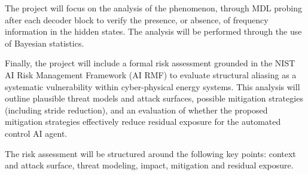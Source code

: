 The project will focus on the analysis of the phenomenon, through MDL probing \cite{voitaInformationTheoreticProbingMinimum2020} after each decoder block to verify the presence, or absence, of frequency information in the hidden states. The analysis will be performed through the use of Bayesian statistics. 

Finally, the project will include a formal risk assessment grounded in the NIST AI Risk Management Framework (AI RMF) \cite{tabassiArtificialIntelligenceRisk2023} to evaluate structural aliasing as a systematic vulnerability within cyber-physical energy systems. This analysis will outline plausible threat models and attack surfaces, possible mitigation strategies (including stride reduction), and an evaluation of whether the proposed mitigation strategies effectively reduce residual exposure for the automated control AI agent. 

The risk assessment will be structured around the following key points: context and attack surface, threat modeling, impact, mitigation and residual exposure.